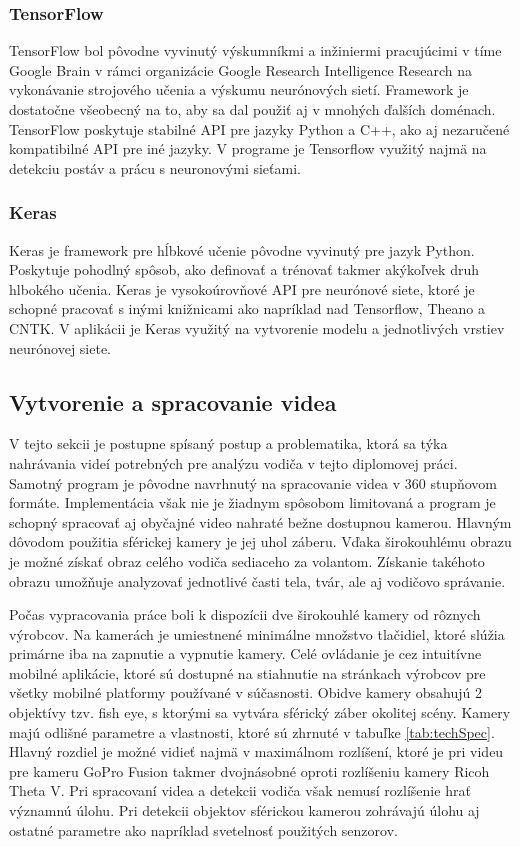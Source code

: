\documentclass[slovak,master,dept460,male,cpp,cpdeclaration]{diploma}
\begin{document}
\subsubsection*{TensorFlow}
TensorFlow\cite{tensorflow2015-whitepaper} bol pôvodne vyvinutý výskumníkmi a inžiniermi pracujúcimi v tíme Google Brain v rámci organizácie Google Research Intelligence Research na vykonávanie strojového učenia a výskumu neurónových sietí. Framework je dostatočne všeobecný na to, aby sa dal použiť aj v mnohých ďalších doménach. TensorFlow poskytuje stabilné API  pre jazyky Python a C++, ako aj nezaručené kompatibilné API pre iné jazyky. V programe je Tensorflow využitý najmä na detekciu postáv a prácu s neuronovými sieťami.



\subsubsection*{Keras}
Keras\cite{chollet2015keras} je framework pre hĺbkové učenie pôvodne vyvinutý pre jazyk Python. Poskytuje pohodlný spôsob, ako definovať a trénovať takmer akýkoľvek druh hlbokého učenia. Keras je vysokoúrovňové API pre neurónové siete, ktoré je schopné pracovať s inými knižnicami ako napríklad nad Tensorflow, Theano\cite{theano} a CNTK. V aplikácii je Keras využitý na vytvorenie modelu a jednotlivých vrstiev neurónovej siete.



\subsection{Vytvorenie a spracovanie videa}
V tejto sekcii je postupne spísaný postup a problematika, ktorá sa týka nahrávania videí potrebných pre analýzu vodiča v tejto diplomovej práci. Samotný program je pôvodne navrhnutý na spracovanie videa v 360 stupňovom formáte. Implementácia však nie je žiadnym spôsobom limitovaná a program je schopný spracovať aj obyčajné video nahraté bežne dostupnou kamerou. Hlavným dôvodom použitia  sférickej kamery je jej uhol záberu. Vďaka širokouhlému obrazu je možné získať obraz celého vodiča sediaceho za volantom. Získanie takéhoto obrazu umožňuje analyzovať jednotlivé časti tela, tvár, ale aj vodičovo správanie.\par
 Počas vypracovania práce boli k dispozícii dve širokouhlé kamery od rôznych výrobcov. Na kamerách je umiestnené minimálne množstvo tlačidiel, ktoré slúžia primárne iba na zapnutie a vypnutie kamery. Celé ovládanie je cez intuitívne mobilné aplikácie, ktoré sú dostupné na stiahnutie na stránkach výrobcov pre všetky mobilné platformy používané v súčasnosti. Obidve kamery obsahujú 2 objektívy tzv. fish eye, s ktorými sa vytvára sférický záber okolitej scény. Kamery majú odlišné parametre a vlastnosti, ktoré sú zhrnuté v tabuľke \ref{tab:techSpec}. Hlavný rozdiel je možné vidieť najmä v maximálnom rozlíšení, ktoré je pri videu pre kameru GoPro Fusion takmer dvojnásobné oproti rozlíšeniu kamery Ricoh Theta V. Pri spracovaní videa a detekcii vodiča však nemusí rozlíšenie hrať významnú úlohu. Pri detekcii objektov sférickou kamerou zohrávajú úlohu aj ostatné parametre ako napríklad svetelnosť použitých senzorov.
\end{document}
